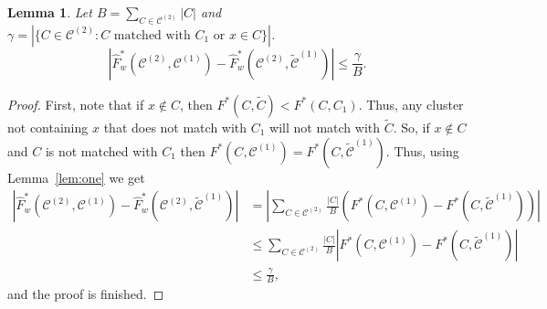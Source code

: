 \documentclass[review,los,12pt]{ryethesis}
\newtheorem{lemma}[theorem]{Lemma}
\newcommand\cCone{\mathcal{C}^{(1)}}
\newcommand\tcCone{\tilde{\mathcal{C}}^{(1)}}
\newcommand\cCtwo{\mathcal{C}^{(2)}}
\begin{document}
\begin{lemma} \label{lem:three}
    Let $B = \sum_{C \in \cCtwo} |C|$ and $\gamma = \left| \{ C \in \cCtwo : C \text{ matched with } C_1 \text{ or } x \in C\} \right|$.
    \begin{equation*}
        \left| \hat{F}^*_w(\cCtwo, \cCone) - \hat{F}^*_w(\cCtwo, \tcCone) \right| \leq \frac{ \gamma }{B}.
    \end{equation*}
\end{lemma}
\begin{proof}
    First, note that if $x \not \in C$, then $F^*(C, \tilde{C}) < F^*(C, C_1)$.
    Thus, any cluster not containing $x$ that does not match with $C_1$ will not match with $\tilde{C}$.
    So, if $ x \not \in C$ and $C$ is not matched with $C_1$ then $F^*(C, \cCone) = F^*(C, \tcCone)$.
    Thus, using Lemma~\ref{lem:one} we get
    \begin{align*}
        \left| \hat{F}^*_w(\cCtwo, \cCone) - \hat{F}^*_w(\cCtwo, \tcCone) \right| &= \left| \sum_{C \in \cCtwo} \frac{|C|}{B} \left( F^*(C, \cCone) - F^*(C, \tcCone) \right) \right| \\
        & \leq \sum_{C \in \cCtwo} \frac{|C|}{B} \left| F^*(C, \cCone) - F^*(C, \tcCone) \right| \\
        & \leq \frac{ \gamma }{B},
    \end{align*}
    and the proof is finished.
\end{proof}
\end{document}

